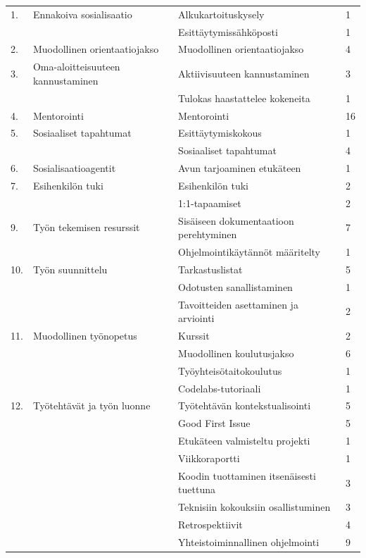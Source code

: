 \documentclass[utf8]{gradu3}
\begin{document}
\begin{scriptsize}
\begin{longtable}[c]{llll}
    1. & Ennakoiva sosialisaatio & Alkukartoituskysely & 1 \\
    & & Esittäytymissähköposti & 1 \\
    \hline
    2. & Muodollinen orientaatiojakso & Muodollinen orientaatiojakso & 4\\
    \hline
    3. & Oma-aloitteisuuteen kannustaminen & Aktiivisuuteen kannustaminen & 3 \\
    & & Tulokas haastattelee kokeneita & 1 \\
    \hline
    4. & Mentorointi & Mentorointi & 16 \\
    \hline
    5. & Sosiaaliset tapahtumat & Esittäytymiskokous & 1 \\
    & & Sosiaaliset tapahtumat & 4\\
    \hline
    6. & Sosialisaatioagentit & Avun tarjoaminen etukäteen & 1 \\
    \hline
    7. & Esihenkilön tuki & Esihenkilön tuki & 2 \\
    & & 1:1-tapaamiset & 2 \\
    \hline
    9. & Työn tekemisen resurssit & Sisäiseen dokumentaatioon perehtyminen & 7 \\
    & & Ohjelmointikäytännöt määritelty & 1 \\
    \hline
    10. & Työn suunnittelu & Tarkastuslistat & 5\\
    & & Odotusten sanallistaminen & 1 \\
    & & Tavoitteiden asettaminen ja arviointi & 2\\
    \hline
    11. & Muodollinen työnopetus & Kurssit & 2 \\
    & & Muodollinen koulutusjakso & 6 \\
    & & Työyhteisötaitokoulutus & 1\\
    & & Codelabs-tutoriaali & 1\\
    \hline
    12. & Työtehtävät ja työn luonne & Työtehtävän kontekstualisointi & 5 \\
    & & Good First Issue & 5 \\
    & & Etukäteen valmisteltu projekti & 1 \\
    & & Viikkoraportti & 1 \\
    & & Koodin tuottaminen itsenäisesti tuettuna & 3\\
    & & Teknisiin kokouksiin osallistuminen & 3\\
    & & Retrospektiivit & 4\\
    & & Yhteistoiminnallinen ohjelmointi & 9\\

\end{longtable}
\end{scriptsize}
\end{document}
